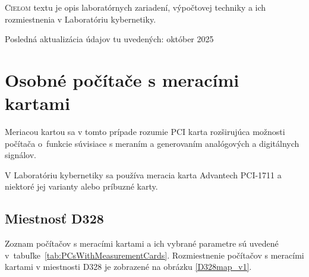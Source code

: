 \documentclass[a4paper, 10pt, ]{article}
\begin{document}
\bigskip

\normalsize
\normalfont

\lstset{style=mystyle}










\noindent
\lettrine[lines=1, nindent=1pt, loversize=0.0]{C}{ieľom} 
textu je opis laboratórnych zariadení, výpočtovej techniky a ich rozmiestnenia v Laboratóriu kybernetiky.

\medskip

\noindent
Posledná aktualizácia údajov tu uvedených: október 2025


\section{Osobné počítače s meracími kartami}

Meriacou kartou sa v tomto prípade rozumie PCI karta rozširujúca možnosti počítača o~funkcie súvisiace s meraním a generovaním analógových a digitálnych signálov.

V Laboratóriu kybernetiky sa používa meracia karta Advantech PCI-1711 a niektoré jej varianty alebo príbuzné karty.



\subsection{Miestnosť D328}

Zoznam počítačov s meracími kartami a ich vybrané parametre sú uvedené v~tabuľke~\ref{tab:PCsWithMeasurementCards}. Rozmiestnenie počítačov s meracími kartami v miestnosti D328 je zobrazené na obrázku \ref{D328map_v1}.
\end{document}
